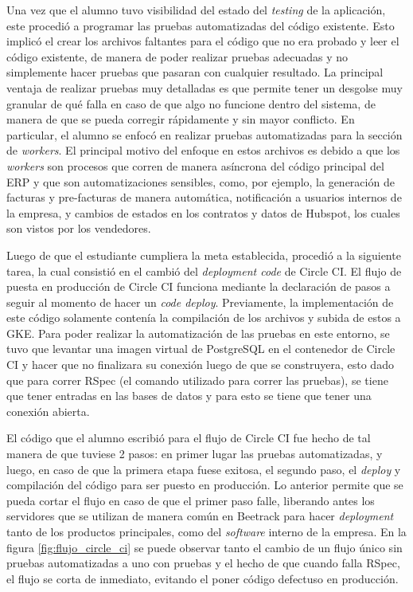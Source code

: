   Una vez que el alumno tuvo visibilidad del estado del \textit{testing} de la aplicación, este procedió a programar las pruebas automatizadas del código existente. Esto implicó el crear los archivos faltantes para el código que no era probado y leer el código existente, de manera de poder realizar pruebas adecuadas y no simplemente hacer pruebas que pasaran con cualquier resultado. La principal ventaja de realizar pruebas muy detalladas es que permite tener un desgolse muy granular de qué falla en caso de que algo no funcione dentro del sistema, de manera de que se pueda corregir rápidamente y sin mayor conflicto. En particular, el alumno se enfocó en realizar pruebas automatizadas para la sección de \textit{workers}. El principal motivo del enfoque en estos archivos es debido a que los \textit{workers} son procesos que corren de manera asíncrona del código principal del ERP y que son automatizaciones sensibles, como, por ejemplo, la generación de facturas y pre-facturas de manera automática, notificación a usuarios internos de la empresa, y cambios de estados en los contratos y datos de Hubspot, los cuales son vistos por los vendedores.

  Luego de que el estudiante cumpliera la meta establecida, procedió a la siguiente tarea, la cual consistió en el cambió del \textit{deployment code} de Circle CI. El flujo de puesta en producción de Circle CI funciona mediante la declaración de pasos a seguir al momento de hacer un \textit{code deploy}. Previamente, la implementación de este código solamente contenía la compilación de los archivos y subida de estos a GKE. Para poder realizar la automatización de las pruebas en este entorno, se tuvo que levantar una imagen virtual de PostgreSQL en el contenedor de Circle CI y hacer que no finalizara su conexión luego de que se construyera, esto dado que para correr RSpec (el comando utilizado para correr las pruebas), se tiene que tener entradas en las bases de datos y para esto se tiene que tener una conexión abierta.

  El código que el alumno escribió para el flujo de Circle CI fue hecho de tal manera de que tuviese 2 pasos: en primer lugar las pruebas automatizadas, y luego, en caso de que la primera etapa fuese exitosa, el segundo paso, el \textit{deploy} y compilación del código para ser puesto en producción. Lo anterior permite que se pueda cortar el flujo en caso de que el primer paso falle, liberando antes los servidores que se utilizan de manera común en Beetrack para hacer \textit{deployment} tanto de los productos principales, como del \textit{software} interno de la empresa. En la figura \ref{fig:flujo_circle_ci} se puede observar tanto el cambio de un flujo único sin pruebas automatizadas a uno con pruebas y el hecho de que cuando falla RSpec, el flujo se corta de inmediato, evitando el poner código defectuso en producción.

